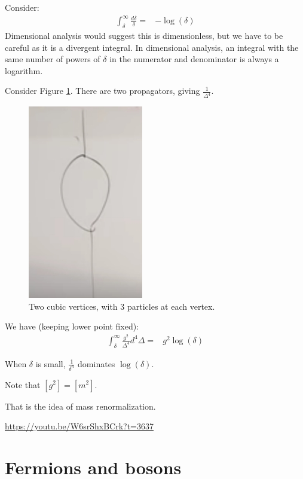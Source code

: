 \documentclass[]{article}
\begin{document}
Consider:
\begin{align*}
	\int_{\delta}^{\infty} \frac{d \delta}{\delta} =& - \log(\delta)
\end{align*}
Dimensional analysis would suggest this is dimensionless, but we have to be careful as it is a divergent integral. In dimensional analysis, an integral with  the same number of powers of $\delta$ in the numerator and denominator is always a logarithm.

Consider Figure \ref{fig:particles3-1-two-cubic-vertices}. There are two propagators, giving $\frac{1}{\Delta^4}$.
\begin{figure}[H]
	\begin{center}
		\caption{Two cubic vertices, with 3 particles at each vertex.}\label{fig:particles3-1-two-cubic-vertices}
		\includegraphics{particles3-1-two-cubic-vertices}
	\end{center}
\end{figure}

We have (keeping lower point fixed):
\begin{align*}
\int_{\delta}^{\infty} \frac{g^2}{\Delta^4} d^4 \Delta =& g^2 \log(\delta)
\end{align*}

When $\delta$ is small, $\frac{1}{\delta^n}$ dominates $\log(\delta)$.

Note that $[g^2] = [m^2]$.

That is the idea of mass renormalization.

\url{https://youtu.be/W6srShxBCrk?t=3637}
	
\section{Fermions and bosons}
\end{document}

